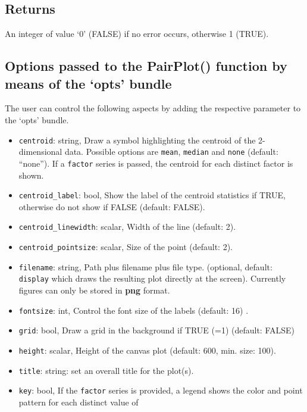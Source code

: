 \documentclass{article}
\begin{document}
\subsection{Returns}\label{returns}

An integer of value `0' (FALSE) if no error occurs, otherwise 1 (TRUE).

\subsection{Options passed to the PairPlot() function by means of the
`opts'
bundle}\label{options-passed-to-the-pairplot-function-by-means-of-the-opts-bundle}

The user can control the following aspects by adding the respective
parameter to the `opts' bundle.

\begin{itemize}
\item
  \texttt{centroid}: string, Draw a symbol highlighting the centroid of
  the 2-dimensional data. Possible options are \texttt{mean},
  \texttt{median} and \texttt{none} (default: ``none''). If a
  \texttt{factor} series is passed, the centroid for each distinct
  factor is shown.
\item
  \texttt{centroid\_label}: bool, Show the label of the centroid
  statistics if TRUE, otherwise do not show if FALSE (default: FALSE).
\item
  \texttt{centroid\_linewidth}: scalar, Width of the line (default: 2).
\item
  \texttt{centroid\_pointsize}: scalar, Size of the point (default: 2).
\item
  \texttt{filename}: string, Path plus filename plus file type.
  (optional, default: \texttt{display} which draws the resulting plot
  directly at the screen). Currently figures can only be stored in
  \textbf{png} format.
\item
  \texttt{fontsize}: int, Control the font size of the labels (default:
  16) .
\item
  \texttt{grid}: bool, Draw a grid in the background if TRUE (=1)
  (default: FALSE)
\item
  \texttt{height}: scalar, Height of the canvas plot (default: 600, min.
  size: 100).
\item
  \texttt{title}: string: set an overall title for the plot(s).
\item
  \texttt{key}: bool, If the \texttt{factor} series is provided, a
  legend shows the color and point pattern for each distinct value of

\end{itemize}
\end{document}

